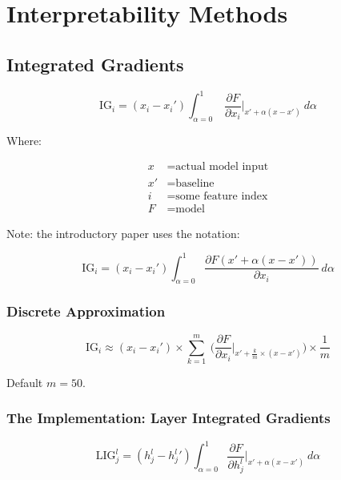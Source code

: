 \documentclass{article}
\begin{document}
	
	\section{Interpretability Methods}
	
	\subsection{Integrated Gradients}
	
	\begin{equation}
		\text{IG}_i = (x_i - x_i') \int_{\alpha=0}^{1} \ \frac{\partial F}{\partial x_i} \Big|_{x' + \alpha (x - x')} \ d\alpha
	\end{equation}

	\noindent Where:
	
	\begin{align*}
		x &= \text{actual model input} \\
		x' &= \text{baseline} \\
		i &= \text{some feature index} \\
		F &= \text{model}
	\end{align*}

	\noindent Note: the introductory paper uses the notation:
	
		\begin{equation}
		\text{IG}_i = (x_i - x_i') \int_{\alpha=0}^{1} \frac{\partial F(x' + \alpha (x - x'))}{\partial x_i} \ d\alpha
		\end{equation}
	
	\subsubsection{Discrete Approximation}
	
	\begin{equation}
		\text{IG}_i \approx (x_i - x_i') \times \sum_{k=1}^{m} \ \bigg( \frac{\partial F}{\partial x_i} \Big|_{x' + \frac{k}{m} \times (x - x')} \bigg) \times \frac{1}{m}
	\end{equation}
	
	\noindent Default $m = 50$.
	
	\subsubsection*{The Implementation: Layer Integrated Gradients}
	
	\begin{equation}
		\text{LIG}_{j}^{l} = (h_{j}^{l} - {h_{j}^{l}}') \int_{\alpha=0}^{1} \frac{\partial F}{\partial h_{j}^{l}}  \Big|_{x' + \alpha (x - x')} \ d\alpha
	\end{equation}
	
\end{document}

